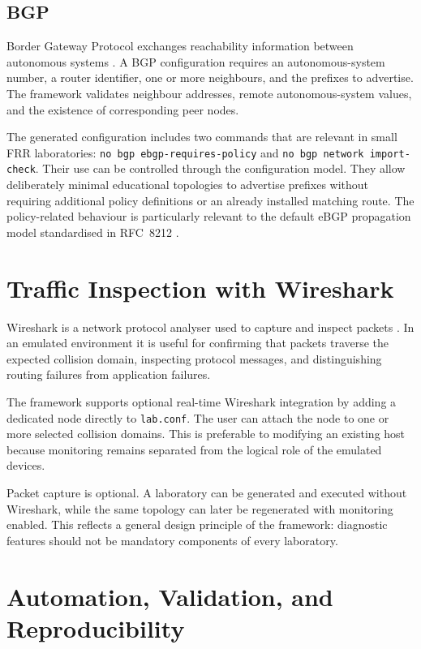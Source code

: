 \subsection{BGP}
\label{subsec:bgp-background}

Border Gateway Protocol exchanges reachability information between autonomous
systems \cite{rfc4271}. A BGP configuration requires an autonomous-system number, a router
identifier, one or more neighbours, and the prefixes to advertise. The
framework validates neighbour addresses, remote autonomous-system values, and
the existence of corresponding peer nodes.

The generated configuration includes two commands that are relevant in small
FRR laboratories: \texttt{no bgp ebgp-requires-policy} and
\texttt{no bgp network import-check}. Their use can be controlled through the
configuration model. They allow deliberately minimal educational topologies
to advertise prefixes without requiring additional policy definitions or an
already installed matching route. The policy-related behaviour is particularly
relevant to the default eBGP propagation model standardised in RFC~8212
\cite{rfc8212}.

\section{Traffic Inspection with Wireshark}
\label{sec:wireshark-background}

Wireshark is a network protocol analyser used to capture and inspect packets
\cite{wireshark_user_guide}. In an emulated environment it is useful for confirming
that packets traverse the expected collision domain, inspecting protocol
messages, and distinguishing routing failures from application failures.

The framework supports optional real-time Wireshark integration by adding a
dedicated node directly to \texttt{lab.conf}. The user can attach the node to
one or more selected collision domains. This is preferable to modifying an
existing host because monitoring remains separated from the logical role of
the emulated devices.

Packet capture is optional. A laboratory can be generated and executed without
Wireshark, while the same topology can later be regenerated with monitoring
enabled. This reflects a general design principle of the framework: diagnostic
features should not be mandatory components of every laboratory.

\section{Automation, Validation, and Reproducibility}
\label{sec:automation-reproducibility}


